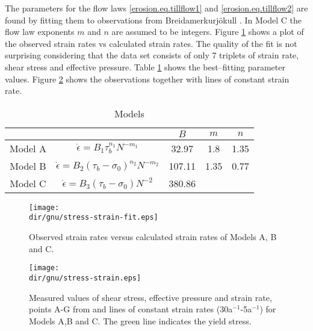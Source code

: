 The parameters for the flow laws \eqref{erosion.eq.tillflow1} and \eqref{erosion.eq.tillflow2} are found by fitting them to observations from Breidamerkurj\"okull \citep{Boulton1987}. In Model C the flow law exponents $m$ and $n$ are assumed to be integers. Figure \ref{erosion.fig.stress-strain-fit} shows a plot of the observed strain rates vs calculated strain rates. The quality of the fit is not surprising considering that the data set consists of only 7 triplets of strain rate, shear stress and effective pressure. Table \ref{erosion.tab.models} shows the best--fitting parameter values. Figure \ref{erosion.fig.stress-strain} shows the observations together with lines of constant strain rate.

\begin{table}[htbp]
  \centering
  \begin{tabular}{|c|c|ccc|}
    \hline
    \multicolumn{2}{c|}{} & $B$ & $m$ & $n$ \\
    \hline
    Model A& $\dot\epsilon=B_1{\tau_b^{n_1}}{N^{-m_1}}$            & 32.97  & 1.8 & 1.35 \\
    Model B& $\dot\epsilon=B_2{(\tau_b-\sigma_0)^{n_2}}{N^{-m_2}}$ & 107.11 & 1.35 & 0.77 \\
    Model C& $\dot\epsilon=B_3{(\tau_b-\sigma_0)}{N^{-2}}$         & 380.86 & \multicolumn{2}{c|}{}\\
    \hline
  \end{tabular}
  \caption{Models}
  \label{erosion.tab.models}
\end{table}


\begin{figure}[htbp]
  \centering
  \texttt{[image: \\dir/gnu/stress-strain-fit.eps]}
  \caption{Observed strain rates versus calculated strain rates of Models A, B and C.}
  \label{erosion.fig.stress-strain-fit}
\end{figure}

\begin{figure}[htbp]
  \centering
  \texttt{[image: \\dir/gnu/stress-strain.eps]}
  \caption{Measured values of shear stress, effective pressure and strain rate, points A-G from \citet{Boulton1987} and lines of constant strain rates (30a$^{-1}$-5a$^{-1}$) for Models A,B and C. The green line indicates the yield stress.}
  \label{erosion.fig.stress-strain}
\end{figure}

